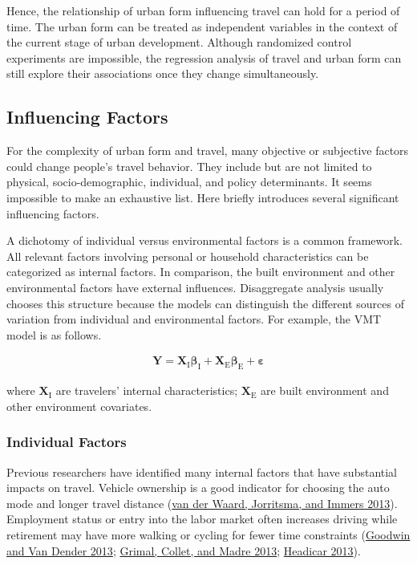 \documentclass[
  12pt,
]{article}
\begin{document}
Hence, the relationship of urban form influencing travel can hold for a period of time. The urban form can be treated as independent variables in the context of the current stage of urban development. Although randomized control experiments are impossible, the regression analysis of travel and urban form can still explore their associations once they change simultaneously.

\hypertarget{influencing-factors}{%
\subsection{Influencing Factors}\label{influencing-factors}}

For the complexity of urban form and travel, many objective or subjective factors could change people's travel behavior. They include but are not limited to physical, socio-demographic, individual, and policy determinants. It seems impossible to make an exhaustive list. Here briefly introduces several significant influencing factors.

A dichotomy of individual versus environmental factors is a common framework. All relevant factors involving personal or household characteristics can be categorized as internal factors. In comparison, the built environment and other environmental factors have external influences. Disaggregate analysis usually chooses this structure because the models can distinguish the different sources of variation from individual and environmental factors. For example, the VMT model is as follows.

\[\begin{aligned}
\mathbf{Y}=\mathbf{X}_\mathrm{I}\boldsymbol{\beta}_\mathrm{I}+\mathbf{X}_\mathrm{E}\boldsymbol{\beta}_\mathrm{E}+\boldsymbol{\varepsilon}
\end{aligned}\]

where \(\mathbf{X}_\mathrm{I}\) are travelers' internal characteristics; \(\mathbf{X}_\mathrm{E}\) are built environment and other environment covariates.

\hypertarget{individual-factors}{%
\subsubsection{Individual Factors}\label{individual-factors}}

Previous researchers have identified many internal factors that have substantial impacts on travel. Vehicle ownership is a good indicator for choosing the auto mode and longer travel distance (\protect\hyperlink{ref-vanderwaardNewDriversMobility2013}{van der Waard, Jorritsma, and Immers 2013}). Employment status or entry into the labor market often increases driving while retirement may have more walking or cycling for fewer time constraints (\protect\hyperlink{ref-goodwinPeakCarThemes2013}{Goodwin and Van Dender 2013}; \protect\hyperlink{ref-grimalStagnationIndividualCar2013}{Grimal, Collet, and Madre 2013}; \protect\hyperlink{ref-headicarChangingSpatialDistribution2013}{Headicar 2013}).
\end{document}
